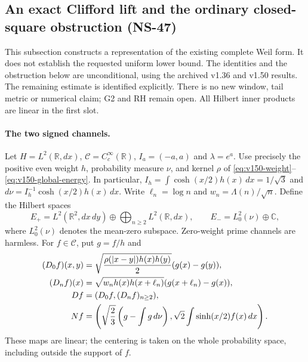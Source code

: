 \subsection*{An exact Clifford lift and the ordinary closed-square obstruction (NS-47)}

This subsection constructs a representation of the existing complete Weil
form. It does not establish the requested uniform lower bound. The
identities and the obstruction below are unconditional, using the archived
v1.36 and v1.50 results. The remaining estimate is identified explicitly.
There is no new window, tail metric or numerical claim; G2 and RH remain
open. All Hilbert inner products are linear in the first slot.

\paragraph{The two signed channels.}
Let $H=L^2(\mathbb R,dx)$, $\mathcal C=C_c^\infty(\mathbb R)$,
$I_a=(-a,a)$ and $\lambda=e^a$. Use precisely the positive even
weight $h$, probability measure $\nu$, and kernel $\rho$ of
\eqref{eq:v150-weight}--\eqref{eq:v150-global-energy}. In particular,
$I_h=\int \cosh(x/2)h(x)\,dx=1/\sqrt3$ and
$d\nu=I_h^{-1}\cosh(x/2)h(x)\,dx$.
Write $\ell_n=\log n$ and $w_n=\Lambda(n)/\sqrt n$.
Define the Hilbert spaces
\[
 E_+=L^2(\mathbb R^2,dx\,dy)\oplus
                 \bigoplus_{n\ge2} L^2(\mathbb R,dx),\qquad
 E_-=L^2_0(\nu)\oplus\mathbb C,
\]
where $L^2_0(\nu)$ denotes the mean-zero subspace. Zero-weight prime
channels are harmless. For $f\in\mathcal C$, put $g=f/h$ and
\begin{align}
 (D_0f)(x,y)&=\sqrt{\frac{\rho(|x-y|)h(x)h(y)}2}
                         (g(x)-g(y)),\notag\\
 (D_nf)(x)&=\sqrt{w_nh(x)h(x+\ell_n)}
                         (g(x+\ell_n)-g(x)),\notag\\
 Df&=(D_0f,(D_nf)_{n\ge2}),\label{eq:ns47-edge-map}\\
 Nf&=\left(\sqrt{\frac23}\left(g-\int g\,d\nu\right),
                  \sqrt2\int\sinh(x/2)f(x)\,dx\right).
 \label{eq:ns47-negative-map}
\end{align}
These maps are linear; the centering is taken on the whole probability
space, including outside the support of $f$.

